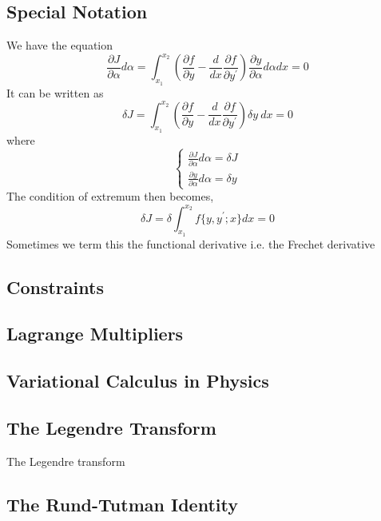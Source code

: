 \subsection{Special Notation}
	We have the equation
\begin{equation}
\frac{\partial J}{\partial \alpha} d\alpha = \int_{x_{1}}^{x_{2}} \left(\frac{\partial f}{\partial y} - \frac{d}{dx}\frac{\partial f}{\partial y^{'}} \right) \frac{\partial y}{\partial \alpha} d \alpha dx = 0
\end{equation}
It can be written as 
\begin{equation}
\delta J = \int_{x_{1}}^{x_{2}} \left(\frac{\partial f}{\partial y} - \frac{d}{dx}\frac{\partial f}{\partial y^{'}} \right) \delta y \ dx = 0
\end{equation}
where
\begin{equation}
\begin{cases}
\frac{\partial J}{\partial \alpha} d\alpha = \delta J\\
\frac{\partial y}{\partial \alpha} d\alpha = \delta y
\end{cases}
\end{equation}
The condition of extremum then becomes,
\begin{equation}
\delta J = \delta \int_{x_{1}}^{x_{2}} f\{y, y^{'}; x\} dx = 0
\end{equation}
Sometimes we term this the functional derivative i.e. the Frechet derivative
\begin{equation}
    
\end{equation}
\subsection{Constraints}
\subsection{Lagrange Multipliers} 
\subsection{Variational Calculus in Physics}
\subsection{The Legendre Transform}
The Legendre transform
\subsection{The Rund-Tutman Identity}

